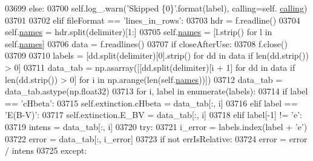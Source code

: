 \begin{DoxyCode}
{{{{{{{{{{{{{{{{{{{{{{03699                     \textcolor{keywordflow}{else}:
03700                         self.log\_.warn(\textcolor{stringliteral}{'Skipped \{0\}'}.format(label), calling=self.
      \hyperlink{classpyneb_1_1core_1_1pynebcore_1_1_observation_a2639fad9af4fefad20e4097295bd40e7}{calling})
03701             
03702         \textcolor{keywordflow}{elif} fileFormat == \textcolor{stringliteral}{'lines\_in\_rows'}:
03703             hdr = f.readline()
03704             self.\hyperlink{classpyneb_1_1core_1_1pynebcore_1_1_observation_a3f365d0b1488b2eba300bf71caf23c17}{names} = hdr.split(delimiter)[1:]
03705             self.\hyperlink{classpyneb_1_1core_1_1pynebcore_1_1_observation_a3f365d0b1488b2eba300bf71caf23c17}{names} =  [l.strip() \textcolor{keywordflow}{for} l \textcolor{keywordflow}{in} self.\hyperlink{classpyneb_1_1core_1_1pynebcore_1_1_observation_a3f365d0b1488b2eba300bf71caf23c17}{names}]
03706             data = f.readlines()
03707             \textcolor{keywordflow}{if} closeAfterUse:
03708                 f.close()
03709 
03710             labels = [dd.split(delimiter)[0].strip() \textcolor{keywordflow}{for} dd \textcolor{keywordflow}{in} data \textcolor{keywordflow}{if} len(dd.strip()) > 0]
03711             data\_tab = np.asarray([[dd.split(delimiter)[i + 1] \textcolor{keywordflow}{for} dd \textcolor{keywordflow}{in} data \textcolor{keywordflow}{if} len(dd.strip()) > 0] \textcolor{keywordflow}{for} i
       \textcolor{keywordflow}{in} np.arange(len(self.\hyperlink{classpyneb_1_1core_1_1pynebcore_1_1_observation_a3f365d0b1488b2eba300bf71caf23c17}{names}))])
03712             data\_tab = data\_tab.astype(np.float32)
03713             \textcolor{keywordflow}{for} i, label \textcolor{keywordflow}{in} enumerate(labels):
03714                 \textcolor{keywordflow}{if} label == \textcolor{stringliteral}{'cHbeta'}:
03715                     self.extinction.cHbeta = data\_tab[:, i]
03716                 \textcolor{keywordflow}{elif} label == \textcolor{stringliteral}{'E(B-V)'}:
03717                     self.extinction.E\_BV = data\_tab[:, i]
03718                 \textcolor{keywordflow}{elif} label[-1] != \textcolor{stringliteral}{'e'}:
03719                     intens = data\_tab[:, i]
03720                     \textcolor{keywordflow}{try}:
03721                         i\_error = labels.index(label + \textcolor{stringliteral}{'e'})
03722                         error = data\_tab[:, i\_error]
03723                         \textcolor{keywordflow}{if} \textcolor{keywordflow}{not} errIsRelative:
03724                             error = error / intens
03725                     \textcolor{keywordflow}{except}:
}}}}}}}}}}}}}}}}}}}}}}
\end{DoxyCode}
